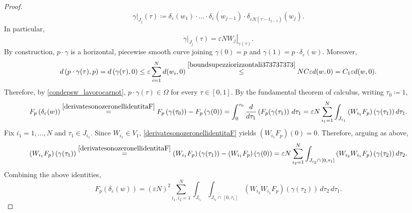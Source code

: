 \documentclass[11pt]{amsart}
\newcommand{\Om}{\Omega}
\newcommand{\eps}{\varepsilon}
\theoremstyle{plain}
\theoremstyle{definition}
\theoremstyle{remark}
\numberwithin{equation}{section}
\begin{document}
\begin{proof}
\begin{equation*}
        \left.\gamma\right|_{J_j}(\tau)\coloneqq \delta_\eps(w_1) \cdot \ldots \cdot \delta_\eps(w_{j-1})\cdot \delta_{\eps N(\tau-t_{j-1})}(w_j).
    \end{equation*}
    In particular, 
    \begin{equation*}
        \left.\dot\gamma\right|_{J_j}(\tau)=\eps N \left.W_j\right|_{\gamma(\tau)}.
    \end{equation*}
    By construction, $p\cdot \gamma$ is a horizontal, piecewise smooth curve joining $\gamma(0)=p$ and $\gamma(1)=p\cdot\delta_\eps(w)$. Moreover, 
    \begin{equation}\label{stimasugammatauuuuuuu}
        d\left(p\cdot \gamma(\tau),p\right)=d\left(\gamma(\tau),0\right)\leq \eps \sum_{i=1}^N d(w_i,0)\overset{\eqref{boundsupezziorizzontali373737373}}{\leq} NC\eps d(w,0)=C_1 \eps d(w,0).
    \end{equation}
    Therefore, by \eqref{condepsw_lavorocarnot}, $p\cdot \gamma(\tau)\in \Om$ for every $\tau\in [0,1]$. By the fundamental theorem of calculus, writing $\tau_0 \coloneqq 1$,
    \begin{equation*}
        \begin{split}
            F_p\left(\delta_\eps(w)\right)\overset{\eqref{derivatesonozeronellidentitaF}}{=}F_p\left(\gamma(\tau_0)\right)-F_p\left(\gamma(0)\right)=\int_0^{\tau_0}\frac{d}{d\tau_1}\left(F_p(\gamma(\tau_1)\right)\,d\tau_1=\eps N \sum_{i_1=1}^N\int_{J_{i_1}}\left(W_{i_1 }F_p\right)(\gamma(\tau_1))\,d\tau_1.
        \end{split}
    \end{equation*}
   Fix $i_1=1,\ldots, N$ and $\tau_1\in J_{i_1}$. Since $W_{i_1}\in V_1$, \eqref{derivatesonozeronellidentitaF} yields $\left(W_{i_1}F_p\right)(0)=0$. Therefore, arguing as above,
\begin{equation*}
        \begin{split}
            \left(W_{i_1}F_p\right)\left(\gamma(\tau_1)\right)\overset{\eqref{derivatesonozeronellidentitaF}}{=}\left(W_{i_1}F_p\right)\left(\gamma(\tau_1)\right)-\left(W_{i_1}F_p\right)\left(\gamma(0)\right)=\eps N \sum_{i_2=1}^N\int_{J_{i_2}\cap \, [0,\tau_1]}\left(W_{i_2}W_{i_1}F_p\right)(\gamma(\tau_2))\,d\tau_2.
        \end{split}
    \end{equation*}
    Combining the above identities,
    \begin{equation*}
        F_p\left(\delta_\eps(w)\right)=(\eps N)^2\sum_{i_1,i_2=1}^N\int_{J_{i_1}}\int_{J_{i_2}\cap \, [0,\tau_1]}\left(W_{i_2}W_{i_1}F_p\right)(\gamma(\tau_2))\,d\tau_2\,d\tau_1.

\end{equation*}
\end{proof}
\end{document}
